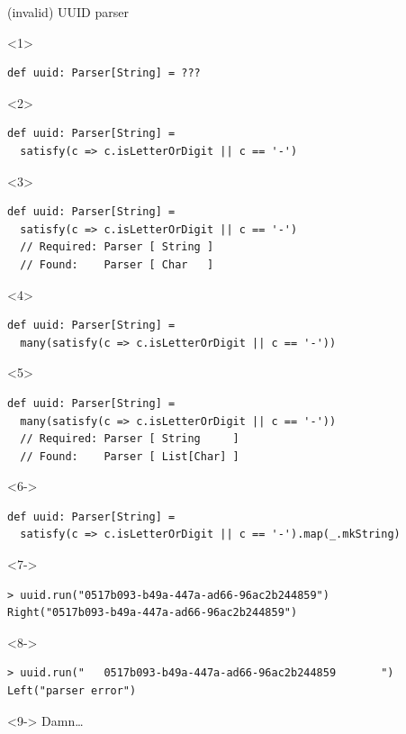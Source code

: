 \documentclass[presentation,aspectratio=169,smaller]{beamer}
\begin{document}
\begin{frame}[label={sec:org43f667f},fragile,t]{(invalid) UUID parser}
 \begin{onlyenv}<1>
\begin{verbatim}
def uuid: Parser[String] = ???
\end{verbatim}
\end{onlyenv}

\begin{onlyenv}<2>
\begin{verbatim}
def uuid: Parser[String] =
  satisfy(c => c.isLetterOrDigit || c == '-')
\end{verbatim}
\end{onlyenv}

\begin{onlyenv}<3>
\begin{verbatim}
def uuid: Parser[String] =
  satisfy(c => c.isLetterOrDigit || c == '-')
  // Required: Parser [ String ]
  // Found:    Parser [ Char   ]
\end{verbatim}
\end{onlyenv}

\begin{onlyenv}<4>
\begin{verbatim}
def uuid: Parser[String] =
  many(satisfy(c => c.isLetterOrDigit || c == '-'))
\end{verbatim}
\end{onlyenv}

\begin{onlyenv}<5>
\begin{verbatim}
def uuid: Parser[String] =
  many(satisfy(c => c.isLetterOrDigit || c == '-'))
  // Required: Parser [ String     ]
  // Found:    Parser [ List[Char] ]
\end{verbatim}
\end{onlyenv}

\begin{onlyenv}<6->
\begin{verbatim}
def uuid: Parser[String] =
  satisfy(c => c.isLetterOrDigit || c == '-').map(_.mkString)
\end{verbatim}
\end{onlyenv}

\begin{onlyenv}<7->
\begin{verbatim}
> uuid.run("0517b093-b49a-447a-ad66-96ac2b244859")
Right("0517b093-b49a-447a-ad66-96ac2b244859")
\end{verbatim}
\end{onlyenv}

\begin{onlyenv}<8->
\begin{verbatim}
> uuid.run("   0517b093-b49a-447a-ad66-96ac2b244859       ")
Left("parser error")
\end{verbatim}
\end{onlyenv}

\begin{onlyenv}<9->
Damn\ldots{}
\end{onlyenv}
\end{frame}
\end{document}
